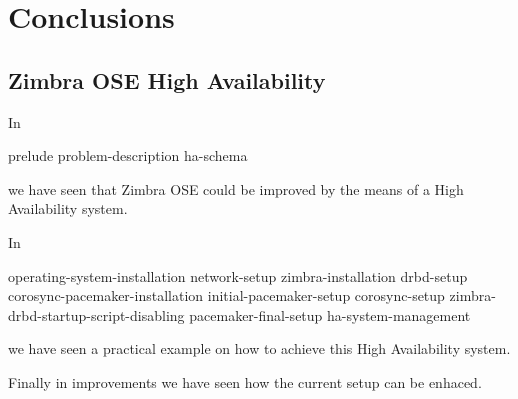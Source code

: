 

\chapter{Conclusions}
\label{chap:conclusions}

\section {Zimbra OSE High Availability}
In 

{prelude}
{problem-description}
{ha-schema}

we have seen that Zimbra OSE could be improved by the means of a High Availability system.

In 

{operating-system-installation}
{network-setup}
{zimbra-installation}
{drbd-setup}
{corosync-pacemaker-installation}
{initial-pacemaker-setup}
{corosync-setup}
{zimbra-drbd-startup-script-disabling}
{pacemaker-final-setup}
{ha-system-management}

we have seen a practical example on how to achieve this High Availability system.

Finally in {improvements} we have seen how the current setup can be enhaced.




